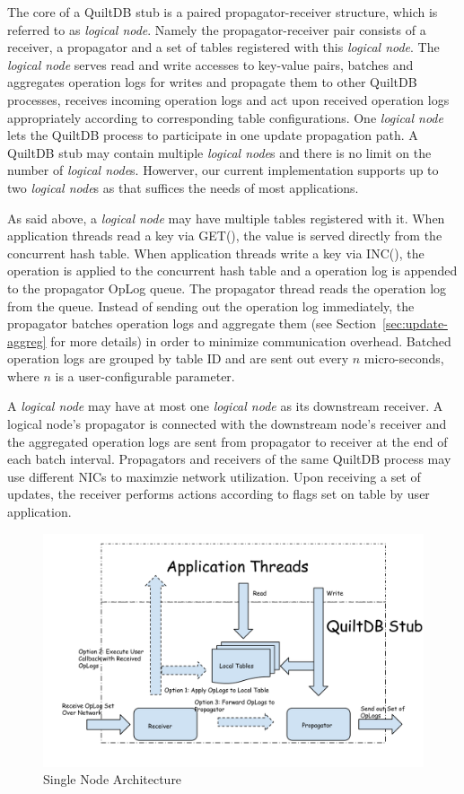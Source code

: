 \documentclass{acm_proc_article-sp}
\begin{document}
The core of a QuiltDB stub is a paired propagator-receiver structure, which is
referred to as \emph{logical node}. Namely the propagator-receiver pair consists
of a receiver, a propagator and a set of tables registered with this
\emph{logical node}. The \emph{logical node} serves read and write accesses to
key-value pairs, batches and aggregates operation logs for writes and propagate
them to other QuiltDB processes, receives incoming operation logs and act upon
received operation logs appropriately according to corresponding table
configurations. One \emph{logical node} lets the QuiltDB process to participate
in one update propagation path. A QuiltDB stub may contain multiple
\emph{logical node}s and there is no limit on the number of \emph{logical
node}s. Howerver, our current implementation supports up to two \emph{logical
node}s as that suffices the needs of most applications.

As said above, a \emph{logical node} may have multiple tables registered with it.
When application threads read a key via GET(), the value is served directly from
the concurrent hash table. When application threads write a key via INC(), the
operation is applied to the concurrent hash table and a operation log is
appended to the propagator OpLog queue. The propagator thread reads the
operation log from the queue. Instead of sending out the operation log
immediately, the propagator batches operation logs and aggregate them (see
Section~\ref{sec:update-aggreg} for more details) in order to minimize
communication overhead. Batched operation logs are grouped by table ID and are
sent out every $n$ micro-seconds, where $n$ is a user-configurable parameter.

A \emph{logical node} may have at most one \emph{logical node} as its downstream
receiver. A logical node's propagator is connected with the downstream node's
receiver and the aggregated operation logs are sent from propagator to receiver
at the end of each batch interval. Propagators and receivers of the same QuiltDB
process may use different NICs to maximzie network utilization. Upon receiving
a set of updates, the receiver performs actions according to flags set on table
by user application.

\begin{figure}[th!]
  \centering
  \includegraphics[width=.5\textwidth]{fig/propagator-receiver.pdf}
  \caption{Single Node Architecture}
  \label{fig:prop-recv}
\end{figure}
\end{document}
